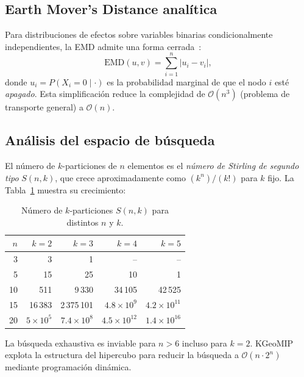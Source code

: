 \documentclass[11pt,letterpaper]{article}
\newcommand{\EMD}{\mathrm{EMD}}
\begin{document}
\subsection{Earth Mover's Distance analítica}

Para distribuciones de efectos sobre variables binarias condicionalmente
independientes, la EMD admite una forma cerrada~\cite{geomip2025}:
\[
  \EMD(u, v) = \sum_{i=1}^{n} \bigl|u_i - v_i\bigr|,
\]
donde $u_i = P(X_i = 0 \mid \cdot)$ es la probabilidad marginal de que el
nodo $i$ esté \emph{apagado}.  Esta simplificación reduce la complejidad de
$\mathcal{O}(n^3)$ (problema de transporte general) a $\mathcal{O}(n)$.

\subsection{Análisis del espacio de búsqueda}

El número de $k$-particiones de $n$ elementos es el
\emph{número de Stirling de segundo tipo} $S(n,k)$, que crece
aproximadamente como $(k^n)/(k!)$ para $k$ fijo.  La Tabla~\ref{tab:stirling}
muestra su crecimiento:

\begin{table}[H]
  \centering
  \caption{Número de $k$-particiones $S(n,k)$ para distintos $n$ y $k$.}
  \label{tab:stirling}
  \begin{tabular}{r r r r r}
    \toprule
    $n$ & $k=2$     & $k=3$        & $k=4$           & $k=5$            \\
    \midrule
     3  &          3 &            1 &              --  &              --  \\
     5  &         15 &           25 &              10  &               1  \\
    10  &        511 &       9\,330 &          34\,105 &          42\,525 \\
    15  &     16\,383 & 2\,375\,101  & $4.8{\times}10^9$ & $4.2{\times}10^{11}$ \\
    20  & $5{\times}10^5$ & $7.4{\times}10^8$ & $4.5{\times}10^{12}$ & $1.4{\times}10^{16}$ \\
    \bottomrule
  \end{tabular}
\end{table}

La búsqueda exhaustiva es inviable para $n > 6$ incluso para $k=2$.
KGeoMIP explota la estructura del hipercubo para reducir la búsqueda a
$\mathcal{O}(n \cdot 2^n)$ mediante programación dinámica.
\end{document}
